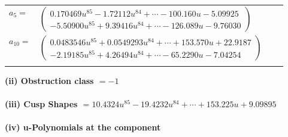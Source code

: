 \documentclass[1p]{elsarticle_modified}
\theoremstyle{definition}
\begin{document}
\begin{tabular}{m{7pt} m{180pt} m{7pt} m{180pt} }
\flushright $a_{5}=$&$\begin{pmatrix}0.170469 u^{85}-1.72112 u^{84}+\cdots-100.160 u-5.09925\\-5.50900 u^{85}+9.39416 u^{84}+\cdots-126.089 u-9.76030\end{pmatrix}$ \\
\flushright $a_{10}=$&$\begin{pmatrix}0.0483546 u^{85}+0.0549293 u^{84}+\cdots+153.570 u+22.9187\\-2.19185 u^{85}+4.26494 u^{84}+\cdots-65.2290 u-7.04254\end{pmatrix}$\\&\end{tabular}
\flushleft \textbf{(ii) Obstruction class $= -1$}\\~\\
\flushleft \textbf{(iii) Cusp Shapes $= 10.4324 u^{85}-19.4232 u^{84}+\cdots+153.225 u+9.09895$}\\~\\
\newpage\renewcommand{\arraystretch}{1}
\flushleft \textbf{(iv) u-Polynomials at the component}\newline \\
\end{document}
